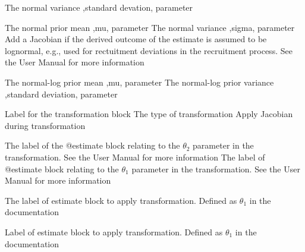 {The normal variance ,standard devation, parameter}
\par\textbf{}\par
{} {The normal prior mean ,mu, parameter}
 {The normal variance ,sigma, parameter}
 {Add a Jacobian if the derived outcome of the estimate is assumed to be lognormal, e.g., used for rectuitment deviations in the recruitment process. See the User Manual for more information}
\par\textbf{}\par
{} {The normal-log prior mean ,mu, parameter}
 {The normal-log prior variance ,standard deviation, parameter}
\par\textbf{}\par
\par\textbf{}\par
{}\par\par
{} {Label for the transformation block}
 {The type of transformation}
 {Apply Jacobian during transformation}
\par\textbf{}\par
{} {The label of the @estimate block relating to the $\theta_2$ parameter in the transformation. See the User Manual for more information}
 {The label of @estimate block relating to the $\theta_1$ parameter in the transformation. See the User Manual for more information}
\par\textbf{}\par
{} {The label of estimate block to apply transformation. Defined as $\theta_1$ in the documentation}
\par\textbf{}\par
{} {Label of estimate block to apply transformation. Defined as $\theta_1$ in the documentation}
\par\textbf{}\par

